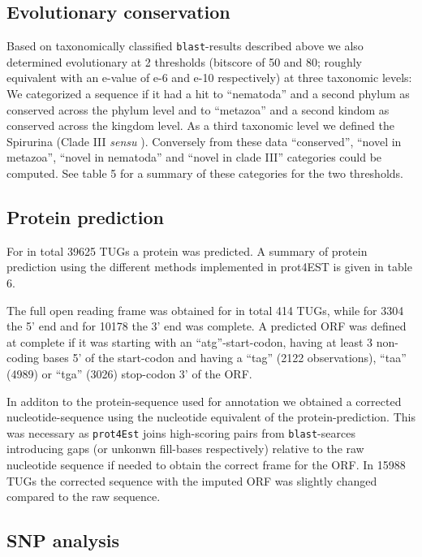 \documentclass[10pt]{bmc_article}
\newenvironment{bmcformat}{\begin{raggedright}\baselineskip20pt\sloppy\setboolean{publ}{false}}{\end{raggedright}\baselineskip20pt\sloppy}
\begin{document}
\begin{bmcformat}
\subsection*{Evolutionary conservation}


Based on taxonomically classified \texttt{blast}-results described
above we also determined evolutionary at 2 thresholds (bitscore of 50
and 80; roughly equivalent with an e-value of e-6 and e-10
respectively) at three taxonomic levels: We categorized a sequence if
it had a hit to ``nematoda'' and a second phylum as conserved across
the phylum level and to ``metazoa'' and a second kindom as conserved
across the kingdom level. As a third taxonomic level we defined the
Spirurina (Clade III \textit{sensu}
\cite{blaxter_molecular_1998}). Conversely from these data
``conserved'', ``novel in metazoa'', ``novel in nematoda'' and ``novel
in clade III'' categories could be computed. See table 5 for a summary
of these categories for the two thresholds.


\subsection*{Protein prediction}



For in total
39625 TUGs
a protein was predicted. A summary of protein prediction using the
different methods implemented in prot4EST is given in table 6.
 
The full open reading frame was obtained for in total
414 TUGs, while for
3304 the 5' end and for
10178 the 3’ end was complete.  A
predicted ORF was defined at complete if it was starting with an
``atg''-start-codon, having at least 3 non-coding bases 5' of the
start-codon and having a ``tag'' (2122
observations), ``taa'' (4989) or ``tga''
(3026) stop-codon 3' of the ORF.

In additon to the protein-sequence used for annotation we obtained a
corrected nucleotide-sequence using the nucleotide equivalent of the
protein-prediction. This was necessary as \texttt{prot4Est} joins
high-scoring pairs from \texttt{blast}-searces introducing gaps (or
unkonwn fill-bases respectively) relative to the raw nucleotide
sequence if needed to obtain the correct frame for the ORF. In
15988 TUGs the corrected sequence with the
imputed ORF was slightly changed compared to the raw sequence.
 
\subsection*{SNP analysis}
\label{sec:snp-analysis}


\end{bmcformat}
\end{document}
